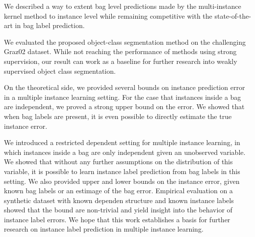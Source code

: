 We described a way to extent bag level predictions made by the multi-instance
kernel method to instance level while remaining competitive with the state-of-the-art
in bag label prediction.

We evaluated the proposed object-class segmentation method on the challenging
Graz02 dataset. While not reaching the performance of methods using strong supervision,
our result can work as a baseline for further research into weakly supervised object class
segmentation.

On the theoretical side, we provided several bounds on instance prediction
error in a multiple instance learning setting.  For the case that instances
inside a bag are independent, we proved a strong upper bound on the error.  We
showed that when bag labels are present, it is even possible to directly
estimate the true instance error.

We introduced a restricted dependent setting for multiple instance learning, in
which instances inside a bag are only independent given an unobserved variable.
We showed that without any further assumptions on the distribution of this
variable, it is possible to learn instance label prediction from bag labels in
this setting. We also provided upper and lower bounds on the instance error,
given known bag labels or an estimage of the bag error.
Empirical evaluation on a synthetic dataset with known dependen structure and
known instance labels showed that the bound are non-trivial and yield insight
into the behavior of instance label errors.  We hope that this work establishes
a basis for further research on instance label prediction in multiple instance
learning.
